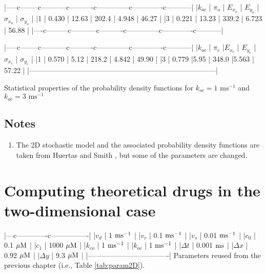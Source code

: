 {|-----c--------c-----------c----------c--------------c-------------c-----------|
|$k_{oc}$ | $\pi_o $ | $E_{x_o}$ | $E_{y_o}$ | $\sigma_{x_o}$ | $\sigma_{y_o}$ |
|1        |    0.430 | 12.63     | 202.4     | 4.948          |  46.27         |
|3        |    0.221 | 13.23     | 339.2     | 6.723          |  56.88         |
|----c---------c-----------c----------c--------------c-------------c-----------|

|-----c--------c-----------c----------c--------------c-------------c-----------|
|$k_{oc}$ | $\pi_c$ |$E_{x_c}$ | $E_{y_c}$ | $\sigma_{x_c}$ | $\sigma_{y_c}$   |
|1        | 0.570   | 5.12     | 218.2     | 4.842          |  49.90           |
|3        | 0.779   |5.95      | 348.0     |5.563           |  57.22           |
|------------------------------------------------------------------------------|

Statistical properties of the probability density functions 
for $k_{oc}=1 \text{ ms}^{-1}$ and  $k_{oc}=3 \text{ ms}^{-1}$

\label{tab:more_open}


\section{Notes}

\begin{enumerate}
\item The 2D stochastic model and the associated probability density functions are taken from Huertas and Smith \cite{Huertas2007}, but some of the parameters are changed.
\end{enumerate}

\chapter{Computing theoretical drugs in the two-dimensional case}

|---c-------------c----------------|
|$v_d $      | 1 $\rm{ms^{-1}}$    |
|$v_r $      | 0.1 $\rm{ms^{-1}}$  |
|$v_s $      | 0.01 $\rm{ms^{-1}}$ |
|$c_0 $      | 0.1 $\rm{\mu M}$    |
|$c_1 $      | 1000 $\rm{\mu M}$   |
|$k_{co} $   | 1 $\rm{ms^{-1}}$    |
|$k_{oc} $   | 1 $\rm{ms^{-1}}$    |
|$\Delta t $ | 0.001 $\rm{ms}$     |
|$\Delta x $ | 0.92 $\rm{\mu M}$   |
|$\Delta y $ | 9.3 $\rm{\mu M}$    |  
|----------------------------------|
Parameters reused from the previous chapter (i.e., Table \ref{tab:param2D}). \label{tab:param2D_again} 


}
